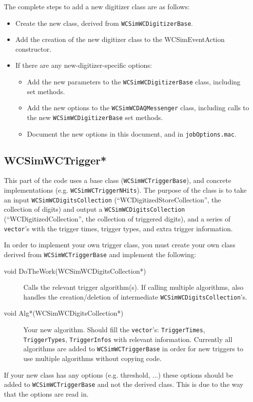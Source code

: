 The complete steps to add a new digitizer class are as follows:
\begin{itemize}
\item Create the new class, derived from \texttt{WCSimWCDigitizerBase}.
\item Add the creation of the new digitizer class to the WCSimEventAction constructor.
\item If there are any new-digitizer-specific options:
  \begin{itemize}
  \item Add the new parameters to the \texttt{WCSimWCDigitizerBase} class, including set methods.
  \item Add the new options to the \texttt{WCSimWCDAQMessenger} class, including calls to the new \texttt{WCSimWCDigitizerBase} set methods.
  \item Document the new options in this document, and in \texttt{jobOptions.mac}.
  \end{itemize}
\end{itemize}


\subsection{WCSimWCTrigger*}
\label{sec:daq:trigger}

This part of the code uses a base class (\texttt{WCSimWCTriggerBase}), and concrete implementations (e.g. \texttt{WCSimWCTriggerNHits}). The purpose of the class is to take an input \texttt{WCSimWCDigitsCollection} (``WCDigitizedStoreCollection'', the collection of digits) and output a \texttt{WCSimWCDigitsCollection} (``WCDigitizedCollection'', the collection of triggered digits), and a series of \texttt{vector}'s with the trigger times, trigger types, and extra trigger information.

In order to implement your own trigger class, you must create your own class derived from \texttt{WCSimWCTriggerBase} and implement the following:
\begin{description}
\item[void DoTheWork(WCSimWCDigitsCollection*)] Calls the relevant trigger algorithm(s). If calling multiple algorithms, also handles the creation/deletion of intermediate \texttt{WCSimWCDigitsCollection}'s.
\item[void Alg*(WCSimWCDigitsCollection*)] Your new algorithm. Should fill the \texttt{vector}'s: \texttt{TriggerTimes}, \texttt{TriggerTypes}, \texttt{TriggerInfos} with relevant information. Currently all algorithms are added to \texttt{WCSimWCTriggerBase} in order for new triggers to use multiple algorithms without copying code.
\end{description}
If your new class has any options (e.g. threshold, ...) these options should be added to \texttt{WCSimWCTriggerBase} and not the derived class. This is due to the way that the options are read in.

